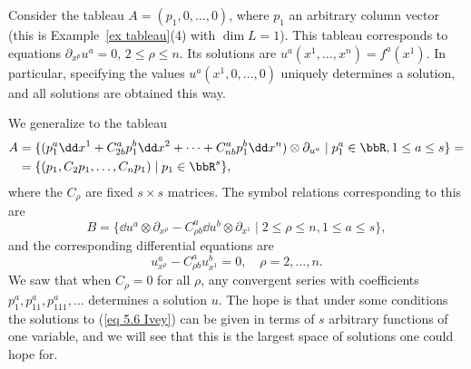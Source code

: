 \begin{example}\label{ex first example Ivey}

Consider the tableau $A=(p_1,0,\ldots,0)$, where $p_1$ an arbitrary column vector (this is Example~\ref{ex tableau}(4) with $\dim L=1$). This tableau corresponds to equations $\partial_{x^p}u^a=0$, $2\leq \rho\leq n$. Its solutions are $u^a(x^1,\ldots,x^n)=f^a(x^1)$. In particular, specifying the values $u^a(x^1,0,\ldots,0)$ uniquely determines a solution, and all solutions are obtained this way.

We generalize to the tableau 
\begin{align}
    A&=\{(p_1^a\dd x^1+C_{2b}^a p_1^b\dd x^2+\cdots +C^a_{nb}p^b_1\dd x^n)\otimes \partial_{u^a}\mid p_1^a\in\bbR,1\leq a\leq s\}= \notag\\
    &= \{(p_1,C_2p_1,\ldots,C_np_1)\mid p_1\in\bbR^s\},\label{eq 5.5 Ivey}
\end{align}
where the $C_\rho$ are fixed $s\times s$ matrices. The symbol relations corresponding to this are 
\[B=\{\dd u^a\otimes \partial_{x^\rho}-C^a_{\rho b}\dd u^b\otimes\partial_{x^1}\mid 2\leq \rho\leq n,1\leq a\leq s\},\]
and the corresponding differential equations are 
\[u^a_{x^\rho}-C^a_{\rho b}u^b_{x^1}=0,\quad \rho=2,\ldots,n.\label{eq 5.6 Ivey}\]
We saw that when $C_\rho= 0$ for all $\rho$, any convergent series with coefficients $p_1^a,p_{11}^a,p^a_{111},\ldots $ determines a solution $u$. The hope is that under some conditions the solutions to (\ref{eq 5.6 Ivey}) can be given in terms of $s$ arbitrary functions of one variable, and we will see that this is the largest space of solutions one could hope for.


\end{example}

